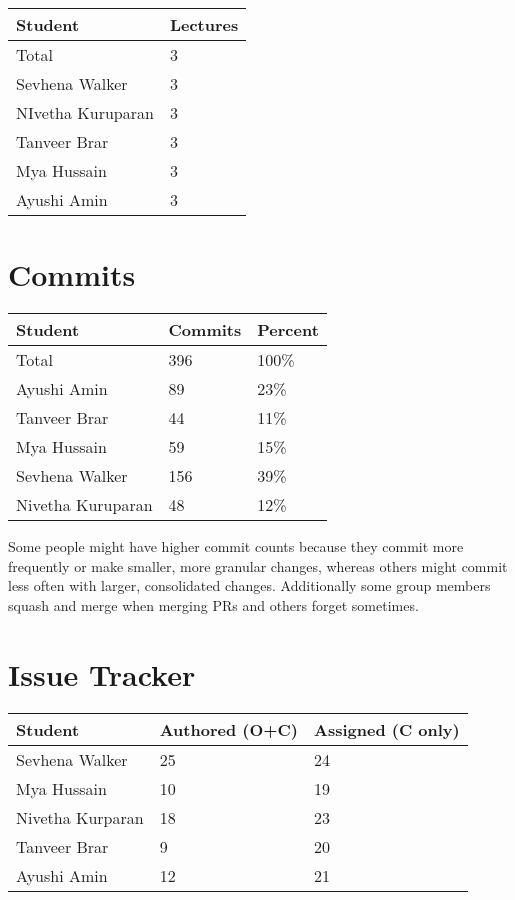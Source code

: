 \documentclass{article}
\begin{document}
\begin{table}[H]
\centering
\begin{tabular}{ll}
\toprule
\textbf{Student} & \textbf{Lectures}\\
\midrule
Total & 3\\
Sevhena Walker & 3\\
NIvetha Kuruparan & 3\\
Tanveer Brar & 3\\
Mya Hussain & 3\\
Ayushi Amin & 3\\
\bottomrule
\end{tabular}
\end{table}

\section{Commits}

\begin{table}[H]
\centering
\begin{tabular}{lll}
\toprule
\textbf{Student} & \textbf{Commits} & \textbf{Percent}\\
\midrule
Total & 396 & 100\% \\
Ayushi Amin & 89 & 23\% \\
Tanveer Brar & 44 & 11\% \\
Mya Hussain & 59 & 15\% \\
Sevhena Walker & 156 & 39\% \\
Nivetha Kuruparan & 48 & 12\% \\
\bottomrule
\end{tabular}
\end{table}

Some people might have higher commit counts because they commit more frequently or make smaller, more granular changes, whereas others might commit less often with larger, consolidated changes. Additionally some group members squash and merge when merging PRs and others forget sometimes.

\section{Issue Tracker}


\begin{table}[H]
\centering
\begin{tabular}{lll}
\toprule
\textbf{Student} & \textbf{Authored (O+C)} & \textbf{Assigned (C only)}\\
\midrule
Sevhena Walker & 25 & 24 \\
Mya Hussain & 10 & 19 \\
Nivetha Kurparan & 18 & 23 \\
Tanveer Brar & 9 & 20 \\
Ayushi Amin & 12 & 21 \\
\bottomrule
\end{tabular}
\end{table}
\end{document}
